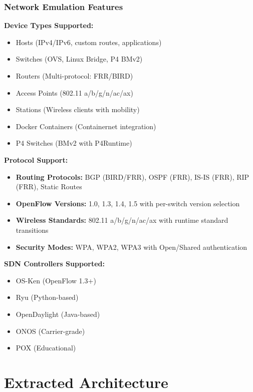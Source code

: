\documentclass[10pt,a4paper]{article}
\begin{document}
\subsubsection{Network Emulation Features}

\textbf{Device Types Supported:}
\begin{itemize}
\item Hosts (IPv4/IPv6, custom routes, applications)
\item Switches (OVS, Linux Bridge, P4 BMv2)
\item Routers (Multi-protocol: FRR/BIRD)
\item Access Points (802.11 a/b/g/n/ac/ax)
\item Stations (Wireless clients with mobility)
\item Docker Containers (Containernet integration)
\item P4 Switches (BMv2 with P4Runtime)
\end{itemize}

\textbf{Protocol Support:}
\begin{itemize}
\item \textbf{Routing Protocols:} BGP (BIRD/FRR), OSPF (FRR), IS-IS (FRR), RIP (FRR), Static Routes
\item \textbf{OpenFlow Versions:} 1.0, 1.3, 1.4, 1.5 with per-switch version selection
\item \textbf{Wireless Standards:} 802.11 a/b/g/n/ac/ax with runtime standard transitions
\item \textbf{Security Modes:} WPA, WPA2, WPA3 with Open/Shared authentication
\end{itemize}

\textbf{SDN Controllers Supported:}
\begin{itemize}
\item OS-Ken (OpenFlow 1.3+)
\item Ryu (Python-based)
\item OpenDaylight (Java-based)
\item ONOS (Carrier-grade)
\item POX (Educational)
\end{itemize}

\section{Extracted Architecture}
\end{document}
